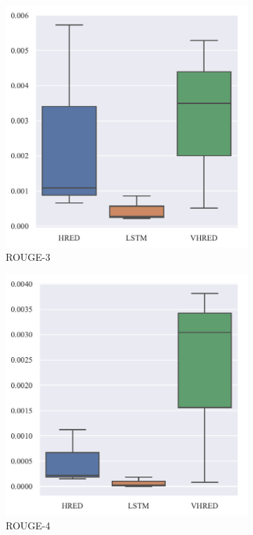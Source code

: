 \begin{figure}[H]
\begin{subfigure}{0.5\linewidth}
        \centering
        \includegraphics[width=0.8\linewidth]{figure/boxplot/model/rouge_3/plot.pdf}
        \caption{ROUGE-3}
    \end{subfigure}%
    \begin{subfigure}{0.5\linewidth}
        \centering
        \includegraphics[width=0.8\linewidth]{figure/boxplot/model/rouge_4/plot.pdf}
        \caption{ROUGE-4}
    \end{subfigure}
    \begin{subfigure}{0.5\linewidth}
        \centering

\end{subfigure}
\end{figure}
